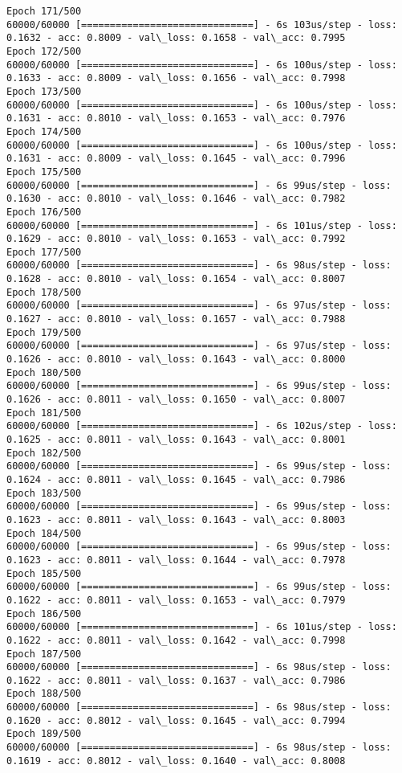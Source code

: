 \documentclass[11pt]{article}
\begin{document}
\begin{Verbatim}[commandchars=\\\{\}]
Epoch 171/500
60000/60000 [==============================] - 6s 103us/step - loss: 0.1632 - acc: 0.8009 - val\_loss: 0.1658 - val\_acc: 0.7995
Epoch 172/500
60000/60000 [==============================] - 6s 100us/step - loss: 0.1633 - acc: 0.8009 - val\_loss: 0.1656 - val\_acc: 0.7998
Epoch 173/500
60000/60000 [==============================] - 6s 100us/step - loss: 0.1631 - acc: 0.8010 - val\_loss: 0.1653 - val\_acc: 0.7976
Epoch 174/500
60000/60000 [==============================] - 6s 100us/step - loss: 0.1631 - acc: 0.8009 - val\_loss: 0.1645 - val\_acc: 0.7996
Epoch 175/500
60000/60000 [==============================] - 6s 99us/step - loss: 0.1630 - acc: 0.8010 - val\_loss: 0.1646 - val\_acc: 0.7982
Epoch 176/500
60000/60000 [==============================] - 6s 101us/step - loss: 0.1629 - acc: 0.8010 - val\_loss: 0.1653 - val\_acc: 0.7992
Epoch 177/500
60000/60000 [==============================] - 6s 98us/step - loss: 0.1628 - acc: 0.8010 - val\_loss: 0.1654 - val\_acc: 0.8007
Epoch 178/500
60000/60000 [==============================] - 6s 97us/step - loss: 0.1627 - acc: 0.8010 - val\_loss: 0.1657 - val\_acc: 0.7988
Epoch 179/500
60000/60000 [==============================] - 6s 97us/step - loss: 0.1626 - acc: 0.8010 - val\_loss: 0.1643 - val\_acc: 0.8000
Epoch 180/500
60000/60000 [==============================] - 6s 99us/step - loss: 0.1626 - acc: 0.8011 - val\_loss: 0.1650 - val\_acc: 0.8007
Epoch 181/500
60000/60000 [==============================] - 6s 102us/step - loss: 0.1625 - acc: 0.8011 - val\_loss: 0.1643 - val\_acc: 0.8001
Epoch 182/500
60000/60000 [==============================] - 6s 99us/step - loss: 0.1624 - acc: 0.8011 - val\_loss: 0.1645 - val\_acc: 0.7986
Epoch 183/500
60000/60000 [==============================] - 6s 99us/step - loss: 0.1623 - acc: 0.8011 - val\_loss: 0.1643 - val\_acc: 0.8003
Epoch 184/500
60000/60000 [==============================] - 6s 99us/step - loss: 0.1623 - acc: 0.8011 - val\_loss: 0.1644 - val\_acc: 0.7978
Epoch 185/500
60000/60000 [==============================] - 6s 99us/step - loss: 0.1622 - acc: 0.8011 - val\_loss: 0.1653 - val\_acc: 0.7979
Epoch 186/500
60000/60000 [==============================] - 6s 101us/step - loss: 0.1622 - acc: 0.8011 - val\_loss: 0.1642 - val\_acc: 0.7998
Epoch 187/500
60000/60000 [==============================] - 6s 98us/step - loss: 0.1622 - acc: 0.8011 - val\_loss: 0.1637 - val\_acc: 0.7986
Epoch 188/500
60000/60000 [==============================] - 6s 98us/step - loss: 0.1620 - acc: 0.8012 - val\_loss: 0.1645 - val\_acc: 0.7994
Epoch 189/500
60000/60000 [==============================] - 6s 98us/step - loss: 0.1619 - acc: 0.8012 - val\_loss: 0.1640 - val\_acc: 0.8008

\end{Verbatim}
\end{document}
